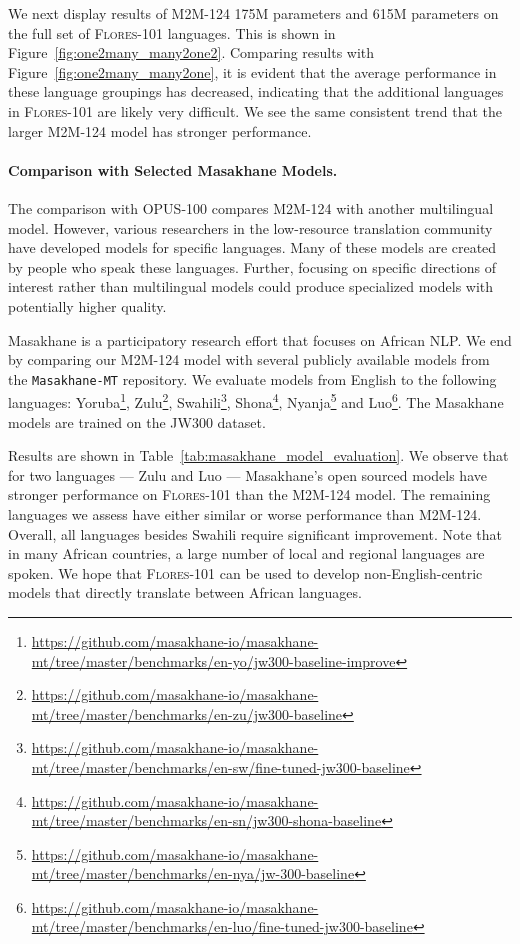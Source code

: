 We next display results of M2M-124 175M parameters and 615M parameters on the full set of \textsc{Flores-101} languages. This is shown in Figure~\ref{fig:one2many_many2one2}. 
Comparing results with Figure~\ref{fig:one2many_many2one}, it is evident that the average performance in these language groupings has decreased, indicating that the additional languages in \textsc{Flores-101} are likely very difficult. We see the same consistent trend that the larger M2M-124 model has stronger performance.

\paragraph{Comparison with Selected Masakhane Models.}

The comparison with OPUS-100 compares M2M-124 with another multilingual model. However, various researchers in the low-resource translation community have developed models for specific languages. Many of these models are created by people who speak these languages. Further, focusing on specific directions of interest rather than multilingual models could produce specialized models with potentially higher quality. 

Masakhane is a participatory research effort that focuses on African NLP. We end by comparing our M2M-124 model with several publicly available models from the \texttt{Masakhane-MT} repository. We evaluate models from English to the following languages: Yoruba\footnote{\url{https://github.com/masakhane-io/masakhane-mt/tree/master/benchmarks/en-yo/jw300-baseline-improve}},  Zulu\footnote{\url{https://github.com/masakhane-io/masakhane-mt/tree/master/benchmarks/en-zu/jw300-baseline}}, Swahili\footnote{\url{https://github.com/masakhane-io/masakhane-mt/tree/master/benchmarks/en-sw/fine-tuned-jw300-baseline}}, Shona\footnote{\url{https://github.com/masakhane-io/masakhane-mt/tree/master/benchmarks/en-sn/jw300-shona-baseline}}, Nyanja\footnote{\url{https://github.com/masakhane-io/masakhane-mt/tree/master/benchmarks/en-nya/jw-300-baseline}} and Luo\footnote{\url{https://github.com/masakhane-io/masakhane-mt/tree/master/benchmarks/en-luo/fine-tuned-jw300-baseline}}. The Masakhane models are trained on the JW300 dataset. 

Results are shown in Table~\ref{tab:masakhane_model_evaluation}. 
We observe that for two languages --- Zulu and Luo --- Masakhane's open sourced models have stronger performance on \textsc{Flores-101} than the M2M-124 model. The remaining languages we assess have either similar or worse performance than M2M-124. Overall, all languages besides Swahili require significant improvement. Note that in many African countries, a large number of local and regional languages are spoken. We hope that \textsc{Flores-101} can be used to develop non-English-centric models that directly translate between African languages.

